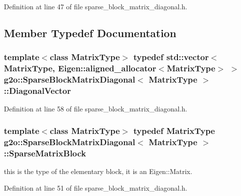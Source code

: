 Definition at line 47 of file sparse\+\_\+block\+\_\+matrix\+\_\+diagonal.\+h.



\subsection{Member Typedef Documentation}
\subsubsection[{\texorpdfstring{Diagonal\+Vector}{DiagonalVector}}]{\setlength{\rightskip}{0pt plus 5cm}template$<$class Matrix\+Type$>$ typedef std\+::vector$<$Matrix\+Type, Eigen\+::aligned\+\_\+allocator$<$Matrix\+Type$>$ $>$ {\bf g2o\+::\+Sparse\+Block\+Matrix\+Diagonal}$<$ Matrix\+Type $>$\+::{\bf Diagonal\+Vector}}\hypertarget{classg2o_1_1SparseBlockMatrixDiagonal_a2eb7fc4130fac5c499b57f3bec855812}{}\label{classg2o_1_1SparseBlockMatrixDiagonal_a2eb7fc4130fac5c499b57f3bec855812}


Definition at line 58 of file sparse\+\_\+block\+\_\+matrix\+\_\+diagonal.\+h.

\subsubsection[{\texorpdfstring{Sparse\+Matrix\+Block}{SparseMatrixBlock}}]{\setlength{\rightskip}{0pt plus 5cm}template$<$class Matrix\+Type$>$ typedef Matrix\+Type {\bf g2o\+::\+Sparse\+Block\+Matrix\+Diagonal}$<$ Matrix\+Type $>$\+::{\bf Sparse\+Matrix\+Block}}\hypertarget{classg2o_1_1SparseBlockMatrixDiagonal_a93a57bc93d5b099fcd424ba1fc1a0585}{}\label{classg2o_1_1SparseBlockMatrixDiagonal_a93a57bc93d5b099fcd424ba1fc1a0585}


this is the type of the elementary block, it is an Eigen\+::\+Matrix. 



Definition at line 51 of file sparse\+\_\+block\+\_\+matrix\+\_\+diagonal.\+h.



